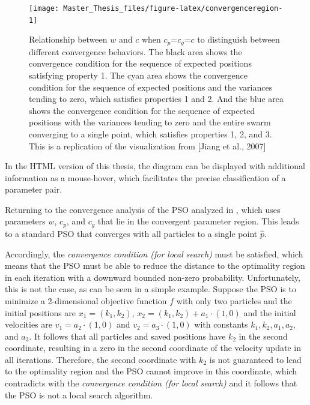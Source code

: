 \documentclass[
  oneside, a4paper, 12pt, openany]{book}
\theoremstyle{definition}
\theoremstyle{definition}
\theoremstyle{definition}
\theoremstyle{definition}
\theoremstyle{remark}
\begin{document}
\begin{figure}[H]
\texttt{[image: Master\_Thesis\_files/figure-latex/convergenceregion-1]} \caption{Relationship between $w$ and $c$ when $c_p$=$c_g$=$c$ to distinguish between different convergence behaviors. The black area shows the convergence condition for the sequence of expected positions satisfying property 1. The cyan area shows the convergence condition for the sequence of expected positions and the variances tending to zero, which satisfies properties 1 and 2. And the blue area shows the convergence condition for the sequence of expected positions with the variances tending to zero and the entire swarm converging to a single point, which satisfies properties 1, 2, and 3. This is a replication of the visualization from [Jiang et al., 2007]}\label{fig:convergenceregion}
\end{figure}

In the HTML version of this thesis, the diagram can be displayed with additional information as a mouse-hover, which facilitates the precise classification of a parameter pair.

Returning to the convergence analysis of the PSO analyzed in \citep{FbEn2010}, which uses parameters \(w\), \(c_p\), and \(c_g\) that lie in the convergent parameter region. This leads to a standard PSO that converges with all particles to a single point \(\hat{p}\).

Accordingly, the \emph{convergence condition (for local search)} must be satisfied, which means that the PSO must be able to reduce the distance to the optimality region in each iteration with a downward bounded non-zero probability. Unfortunately, this is not the case, as can be seen in a simple example. Suppose the PSO is to minimize a 2-dimensional objective function \(f\) with only two particles and the initial positions are \(x_1=(k_1, k_2)\), \(x_2=(k_1, k_2) + a_1 \cdot (1, 0)\) and the initial velocities are \(v_1=a_2 \cdot (1, 0)\) and \(v_2=a_3 \cdot (1, 0)\) with constants \(k_1, k_2, a_1, a_2\), and \(a_3\). It follows that all particles and saved positions have \(k_2\) in the second coordinate, resulting in a zero in the second coordinate of the velocity update in all iterations. Therefore, the second coordinate with \(k_2\) is not guaranteed to lead to the optimality region and the PSO cannot improve in this coordinate, which contradicts with the \emph{convergence condition (for local search)} and it follows that the PSO is not a local search algorithm.
\end{document}

